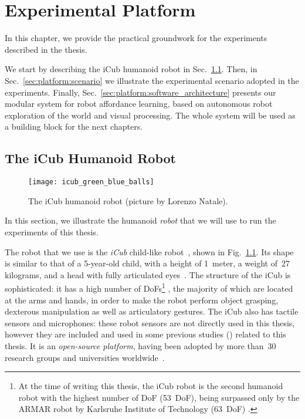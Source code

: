 
\chapter{Experimental Platform}
\label{chap:platform}

In this chapter, we provide the practical groundwork for the experiments described in the thesis.

We start by describing the iCub humanoid robot in Sec.~\ref{sec:platform:icub}.
Then, in Sec.~\ref{sec:platform:scenario} we illustrate the experimental scenario adopted in the experiments.
Finally, Sec.~\ref{sec:platform:software_architecture} presents our modular system for robot affordance learning, based on autonomous robot exploration of the world and visual processing.
The whole system will be used as a building block for the next chapters.

\section{The iCub Humanoid Robot}
\label{sec:platform:icub}

\begin{figure}
\centering
\texttt{[image: icub\_green\_blue\_balls]}
\caption[The iCub humanoid robot.]{The iCub humanoid robot (picture by Lorenzo Natale).}
\label{fig:icub}
\end{figure}

In this section, we illustrate the humanoid \emph{robot} that we will use to run the experiments of this thesis.

The robot that we use is the \emph{iCub} child-like robot~\cite{metta:2010:nn}, shown in Fig.~\ref{fig:icub}.
Its shape is similar to that of a 5-year-old child, with a height of 1~meter, a weight of~27 kilograms, and a head with fully articulated eyes~\cite{beira:2007:msc}.
The structure of the iCub is sophisticated: it has a high number of \acp{DoF}\footnote{%
At the time of writing this thesis, the iCub robot is the second humanoid robot with the highest number of \ac{DoF} (53~\ac{DoF}), being surpassed only by the ARMAR robot by Karlsruhe Institute of Technology (63~\ac{DoF}) \cite{asfour:2019:armar_family}.}%
, the majority of which are located at the arms and hands, in order to make the robot perform object grasping, dexterous manipulation as well as articulatory gestures.
The iCub also has tactile sensors and microphones: these robot sensors are not directly used in this thesis, however they are included and used in some previous studies (\cite{montesano:2008,salvi:2012:smcb}) related to this thesis.
It is an \emph{open-source platform}, having been adopted by more than~30 research groups and universities worldwide~\cite{natale:2019:icub_bookchapter}.


